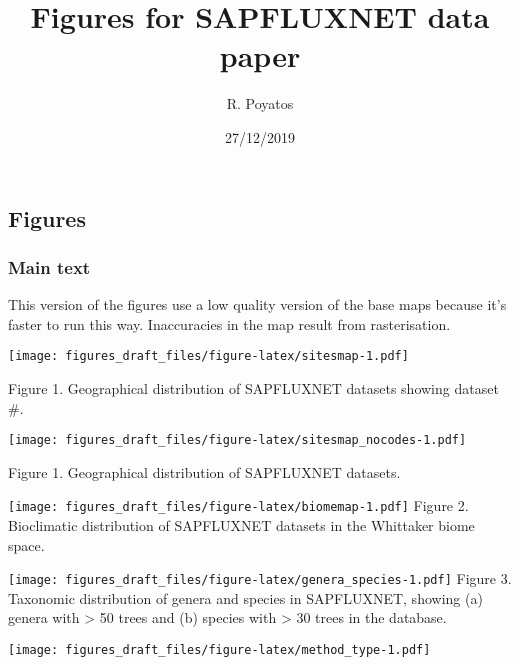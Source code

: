 \documentclass[]{article}
\title{Figures for SAPFLUXNET data paper}
\author{R. Poyatos}
\date{27/12/2019}
\begin{document}
\maketitle

\hypertarget{figures}{%
\subsection{Figures}\label{figures}}

\hypertarget{main-text}{%
\subsubsection{Main text}\label{main-text}}

This version of the figures use a low quality version of the base maps
because it's faster to run this way. Inaccuracies in the map result from
rasterisation.

\pagebreak

\texttt{[image: figures\_draft\_files/figure-latex/sitesmap-1.pdf]}

Figure 1. Geographical distribution of SAPFLUXNET datasets showing
dataset \#.

\pagebreak

\texttt{[image: figures\_draft\_files/figure-latex/sitesmap\_nocodes-1.pdf]}

Figure 1. Geographical distribution of SAPFLUXNET datasets.

\pagebreak

\texttt{[image: figures\_draft\_files/figure-latex/biomemap-1.pdf]} Figure
2. Bioclimatic distribution of SAPFLUXNET datasets in the Whittaker
biome space.

\pagebreak

\texttt{[image: figures\_draft\_files/figure-latex/genera\_species-1.pdf]}
Figure 3. Taxonomic distribution of genera and species in SAPFLUXNET,
showing (a) genera with \textgreater{} 50 trees and (b) species with
\textgreater{} 30 trees in the database.

\pagebreak

\texttt{[image: figures\_draft\_files/figure-latex/method\_type-1.pdf]}
\end{document}
